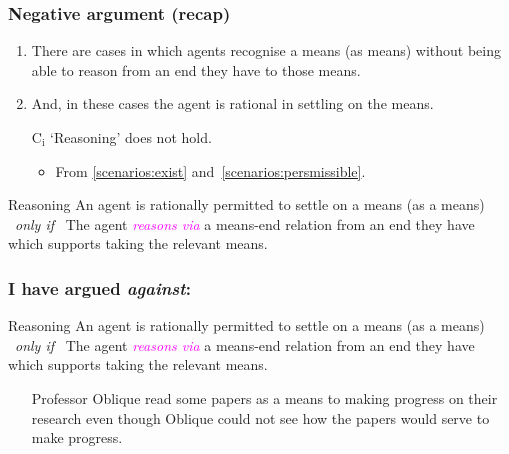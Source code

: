 \documentclass[noamssymb, compress, handout]{beamer} %
\newcommand{\hand}{\ding{43}}
\newcommand{\hozlinedash}[0]{%
  \noindent\hdashrule[0.5ex][c]{\textwidth}{.1pt}{2.5pt}
}
\begin{document}
\begin{frame}
  \frametitle{Negative argument (recap)}

  \begin{enumerate}
  \item\label{scenarios:exist} There are cases in which agents recognise a means (as means) without being able to reason from an end they have to those means.
  \item\label{scenarios:persmissible} And, in these cases the agent is rational in settling on the means.

  \item[C\(_{\text{i}}\)] `Reasoning' does not hold.
    \begin{itemize}
    \item From \ref{scenarios:exist} and~\ref{scenarios:persmissible}.
    \end{itemize}
  \end{enumerate}

  \hozlinedash
  {\footnotesize
    \begin{block}{Reasoning}
      An agent is rationally permitted to settle on a means (as a means)
      \newline
      \mbox{ }\hfill\emph{only if}\hfill\mbox{ }
      \newline
      The agent \textcolor{fuchsia}{\emph{reasons via}}  a means-end relation from an end they have which supports taking the relevant means.
    \end{block}
  }

\end{frame}

\begin{frame}
  \frametitle{I have argued \emph{against}:}

  \begin{block}{Reasoning}
    An agent is rationally permitted to settle on a means (as a means)
    \newline
    \mbox{ }\hfill\emph{only if}\hfill\mbox{ }
    \newline
    The agent \textcolor{fuchsia}{\emph{reasons via}} a means-end relation from an end they have which supports taking the relevant means.
  \end{block}

  \begin{itemize}
  \item[\hand] Professor Oblique read some papers as a means to making progress on their research even though Oblique could not see how the papers would serve to make progress.
  \end{itemize}
\end{frame}
\end{document}
